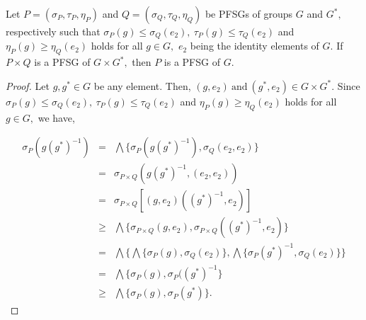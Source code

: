 \documentclass[10pt,a4paper]{amsart}
\begin{document}
\begin{theorem} \label{c}
Let $P = (\sigma_P, \tau_P, \eta_P)$ and $Q = (\sigma_Q, \tau_Q, \eta_Q)$ be PFSGs of groups $G$ and $G^{*},$ respectively such that $\sigma_P(g) \leq \sigma_Q(e_2),~ \tau_P(g) \leq \tau_Q(e_2)$ and $\eta_P(g) \geq \eta_Q(e_2)$ holds for all $g \in G,$ $e_2$ being the identity elements of $G.$ If $P \times Q$ is a PFSG of $G \times G^*,$ then $P$ is a PFSG of $G.$
\end{theorem}

\begin{proof}
Let $g, g^* \in G$ be any element. Then, $(g, e_2)~ \text{and}~ (g^*, e_2) \in G \times G^*.$ Since $\sigma_P(g) \leq \sigma_Q(e_2),~ \tau_P(g) \leq \tau_Q(e_2)$ and $\eta_P(g) \geq \eta_Q(e_2)$ holds for all $g \in G,$ we have, 

\begin{eqnarray*}
\sigma_P(g (g^*)^{-1}) & = & \bigwedge \lbrace \sigma_P(g (g^*)^{-1}), \sigma_Q(e_2, e_2) \rbrace\\
& = & \sigma_{P \times Q}(g (g^*)^{-1}, (e_2, e_2))\\
& = & \sigma_{P \times Q}[(g, e_2)((g^*)^{-1}, e_2)]\\
& \geq & \bigwedge \lbrace \sigma_{P \times Q}(g, e_2), \sigma_{P \times Q}((g^*)^{-1}, e_2) \rbrace\\
& = & \bigwedge \lbrace \bigwedge\lbrace \sigma_P(g), \sigma_Q(e_2)\rbrace, \bigwedge\lbrace \sigma_P(g^*)^{-1}, \sigma_Q(e_2) \rbrace \rbrace\\
& = & \bigwedge\lbrace \sigma_P(g), \sigma_P((g^*)^{-1} \rbrace\\
& \geq & \bigwedge\lbrace \sigma_P(g), \sigma_P(g^*) \rbrace. 
\end{eqnarray*}


\end{proof}
\end{document}

